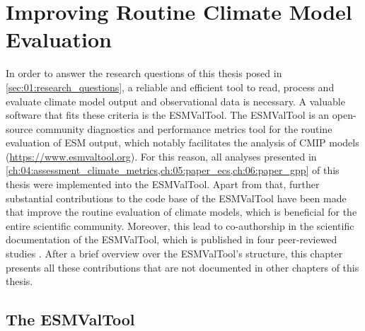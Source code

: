 


\chapter{Improving Routine Climate Model Evaluation}
\label{ch:03:esmvaltool}

In order to answer the research questions of this thesis posed in
\cref{sec:01:research_questions}, a reliable and efficient tool to read,
process and evaluate climate model output and observational data is necessary.
A valuable software that fits these criteria is the \ac{ESMValTool}. The
\ac{ESMValTool} is an open-source community diagnostics and performance metrics
tool for the routine evaluation of \ac{ESM} output, which notably facilitates
the analysis of \ac{CMIP} models (\url{https://www.esmvaltool.org}). For this
reason, all analyses presented in
\cref{ch:04:assessment_climate_metrics,ch:05:paper_ecs,ch:06:paper_gpp} of this
thesis were implemented into the \ac{ESMValTool}. Apart from that, further
substantial contributions to the code base of the \ac{ESMValTool} have been
made that improve the routine evaluation of climate models, which is beneficial
for the entire scientific community. Moreover, this lead to co-authorship in
the scientific documentation of the \ac{ESMValTool}, which is published in four
peer-reviewed studies \autocite{Eyring2020, Lauer2020, Righi2020, Weigel2020}.
After a brief overview over the \ac{ESMValTool}'s structure, this chapter
presents all these contributions that are not documented in other chapters of
this thesis.


\section{The \acf{ESMValTool}}
\label{sec:03:esmvaltool}

